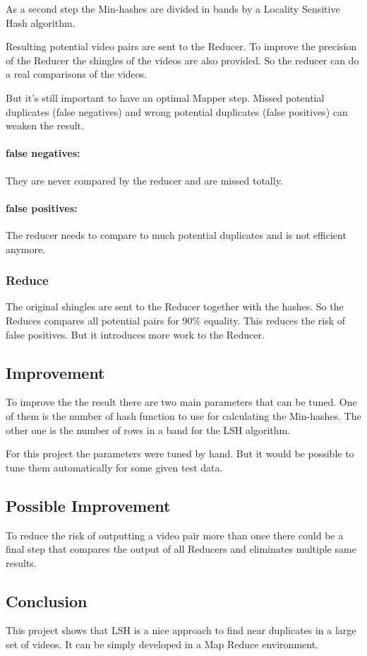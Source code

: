 \documentclass[a4paper, 11pt]{article}
\begin{document}
As a second step the Min-hashes are divided in bands by a Locality Sensitive Hash
algorithm.

Resulting potential video pairs are sent to the Reducer. To improve the precision
of the Reducer the shingles of the videos are also provided. So the reducer can
do a real comparisons of the videos.

But it's still important to have an optimal Mapper step. Missed potential duplicates
(false negatives) and wrong potential duplicates (false positives) can weaken the result.

\paragraph{false negatives:} They are never compared by the reducer and are missed totally.

\paragraph{false positives:} The reducer needs to compare to much potential duplicates and is not
efficient anymore.

\subsubsection{Reduce}

The original shingles are sent to the Reducer together with the hashes. So the Reduces
compares all potential pairs for 90\% equality. This reduces the risk of false positives.
But it introduces more work to the Reducer. 

\subsection{Improvement}

To improve the the result there are two main parameters that can be tuned.
One of them is the number of hash function to use for calculating the Min-hashes.
The other one is the number of rows in a band for the LSH algorithm.

For this project the parameters were tuned by hand. But it would be possible to 
tune them automatically for some given test data.


\subsection{Possible Improvement}

To reduce the risk of outputting a video pair more than once there could be a final
step that compares the output of all Reducers and eliminates multiple same results.

\subsection{Conclusion}

This project shows that LSH is a nice approach to find near duplicates in a large set
of videos. It can be simply developed in a Map Reduce environment.
\end{document}

